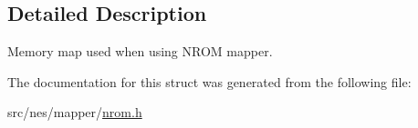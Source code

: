 \subsection{Detailed Description}
Memory map used when using N\+R\+OM mapper. 

The documentation for this struct was generated from the following file\+:\begin{DoxyCompactItemize}
\item 
src/nes/mapper/\hyperlink{nrom_8h}{nrom.\+h}\end{DoxyCompactItemize}
